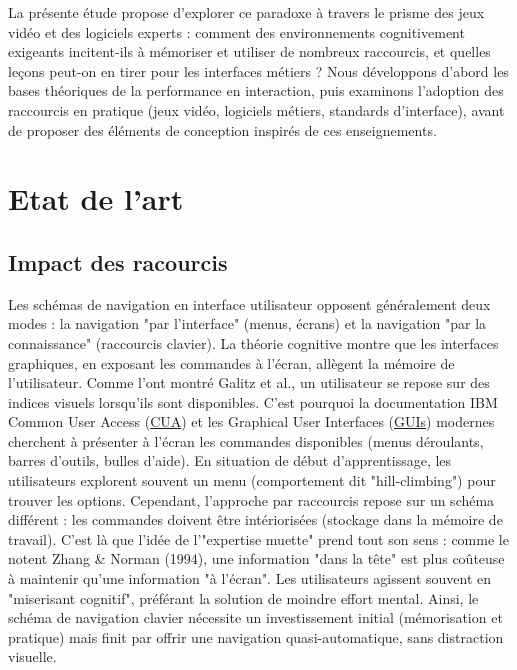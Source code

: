 \documentclass[a4paper,12pt]{article}
\begin{document}
La présente étude propose d'explorer ce paradoxe à travers le prisme des jeux vidéo et des logiciels experts : comment des environnements cognitivement exigeants incitent-ils à mémoriser et utiliser de nombreux raccourcis, et quelles leçons peut-on en tirer pour les interfaces métiers ? Nous développons d'abord les bases théoriques de la performance en interaction, puis examinons l'adoption des raccourcis en pratique (jeux vidéo, logiciels métiers, standards d'interface), avant de proposer des éléments de conception inspirés de ces enseignements.
\section{Etat de l'art}
\label{sec:orga0bc8b4}
\subsection{Impact des racourcis}
\label{sec:orgd0886c8}
Les schémas de navigation en interface utilisateur opposent généralement deux modes : la navigation "par l'interface" (menus, écrans) et la navigation "par la connaissance" (raccourcis clavier). La théorie cognitive montre que les interfaces graphiques, en exposant les commandes à l'écran, allègent la mémoire de l'utilisateur\autocite{peresKeyboardShortcutUsage2004}. Comme l’ont montré Galitz et al., un utilisateur se repose sur des indices visuels lorsqu’ils sont disponibles\autocite{peresKeyboardShortcutUsage2004}. C’est pourquoi la documentation IBM Common User Access
 (\protect\hyperlink{gls-1}{\label{gls-1-use-1}CUA}) et les Graphical User Interfaces (\protect\hyperlink{gls-2}{\label{gls-2-use-1}GUIs}) modernes cherchent à présenter à l'écran les commandes disponibles (menus déroulants, barres d'outils, bulles d’aide). En situation de début d'apprentissage, les utilisateurs explorent souvent un menu (comportement dit "hill-climbing") pour trouver les options\autocite{peresKeyboardShortcutUsage2004}. Cependant, l’approche par raccourcis repose sur un schéma différent : les commandes doivent être intériorisées (stockage dans la mémoire de travail). C’est là que l'idée de l'"expertise muette" prend tout son sens : comme le notent Zhang \& Norman (1994), une information "dans la tête" est plus coûteuse à maintenir qu'une information "à l'écran". Les utilisateurs agissent souvent en "miserisant cognitif", préférant la solution de moindre effort mental\autocite{peresKeyboardShortcutUsage2004}. Ainsi, le schéma de navigation clavier nécessite un investissement initial (mémorisation et pratique) mais finit par offrir une navigation quasi-automatique, sans distraction visuelle.
\end{document}
